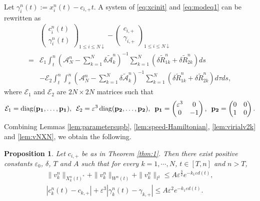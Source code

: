 \documentclass[11pt]{amsart}
\newtheorem{proposition}[theorem]{Proposition}
\theoremstyle{remark}
\numberwithin{equation}{section}
\begin{document}
Let $\gamma_i^n(t):=x_i^n(t)-c_{i,+}t$.
A system of \eqref{eq:xcinit} and \eqref{eq:modeq1} can be rewritten
as
\begin{equation}
  \label{eq:modeq2}
  \begin{split}
& \begin{pmatrix}c_i^n(t) \\ \gamma_i^n(t)\end{pmatrix}_{1\le i\le N\downarrow}
-\begin{pmatrix}c_{i,+} \\ \gamma_{i,+}\end{pmatrix}_{1\le i\le N\downarrow}
\\= &  \mathcal{E}_1 \int_t^n
\left(\mathcal{A}_N^n-\sum_{k=1}^N\delta\widetilde{\mathcal{A}}_k^n\right)^{-1}
\sum_{k=1}^N\left(\delta{\widetilde{R}}_{1k}^n+\delta{\widetilde{R}}_{2k}^n\right)ds
\\ & -\mathcal{E}_2 \int_t^n\int_s^n
\left(\mathcal{A}_N^n-\sum_{k=1}^N\delta\widetilde{\mathcal{A}}_k^n\right)^{-1}
\sum_{k=1}^N\left(\delta{\widetilde{R}}_{1k}^n+\delta{\widetilde{R}}_{2k}^n\right)d\tau ds,
  \end{split}
\end{equation}
where 
$\mathcal{E}_1$ and $\mathcal{E}_2$ are $2N\times 2N$ matrices such that
$$\mathcal{E}_1=\operatorname{diag}(\mathbf{p_1},\dots,\mathbf{p_1}),
\enskip \mathcal{E}_2={\varepsilon}^3\operatorname{diag}(\mathbf{p_2},\dots,\mathbf{p_2}),\enskip
\mathbf{p_1}=\begin{pmatrix} {\varepsilon}^3 & 0 \\ 0 & -1\end{pmatrix},\enskip
\mathbf{p_2}=\begin{pmatrix} 0 & 0 \\ 1 & 0\end{pmatrix}.$$
Combining Lemmas \ref{lem:parametersupb}, \ref{lem:speed-Hamiltonian},
\ref{lem:virialv2k} and \ref{lem:vNXN}, we obtain the following.
\begin{proposition}
  \label{prop:vNupb}
 Let $c_{i,+}$ be as in Theorem \ref{thm:1}. Then there exist positive constants
$\varepsilon_0$, $\delta$, $T$ and $A$
such that for every $k=1, \cdots, N$, $t\in[T,n]$ and $n>T$,
\begin{gather*}
\|v_k^n\|_{X_k^n(t)^*}+\|v_k^n\|_{W^n(t)}+\|v_k^n\|_{l^2}\le A{\varepsilon}^{\frac32}e^{-k_1{\varepsilon} d(t)},
\\
|c_k^n(t)-c_{k,+}|+{\varepsilon}^3|\gamma_k^n(t)-\gamma_{k,+}|\le A{\varepsilon}^2e^{-k_1{\varepsilon} d(t)}.
\end{gather*}
\end{proposition}
\end{document}

